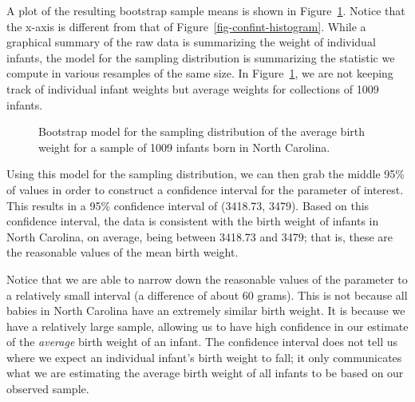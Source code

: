 \documentclass[
  letterpaper,
  DIV=11,
  numbers=noendperiod]{scrreprt}
\theoremstyle{definition}
\theoremstyle{definition}
\theoremstyle{plain}
\theoremstyle{remark}
\begin{document}
A plot of the resulting bootstrap sample means is shown in
Figure~\ref{fig-confint-samp-distn}. Notice that the x-axis is different
from that of Figure~\ref{fig-confint-histogram}. While a graphical
summary of the raw data is summarizing the weight of individual infants,
the model for the sampling distribution is summarizing the statistic we
compute in various resamples of the same size. In
Figure~\ref{fig-confint-samp-distn}, we are not keeping track of
individual infant weights but average weights for collections of 1009
infants.

\begin{figure}


\caption{\label{fig-confint-samp-distn}Bootstrap model for the sampling
distribution of the average birth weight for a sample of 1009 infants
born in North Carolina.}

\end{figure}%

Using this model for the sampling distribution, we can then grab the
middle 95\% of values in order to construct a confidence interval for
the parameter of interest. This results in a 95\% confidence interval of
(3418.73, 3479). Based on this confidence interval, the data is
consistent with the birth weight of infants in North Carolina, on
average, being between 3418.73 and 3479; that is, these are the
reasonable values of the mean birth weight.

Notice that we are able to narrow down the reasonable values of the
parameter to a relatively small interval (a difference of about 60
grams). This is not because all babies in North Carolina have an
extremely similar birth weight. It is because we have a relatively large
sample, allowing us to have high confidence in our estimate of the
\emph{average} birth weight of an infant. The confidence interval does
not tell us where we expect an individual infant's birth weight to fall;
it only communicates what we are estimating the average birth weight of
all infants to be based on our observed sample.
\end{document}
